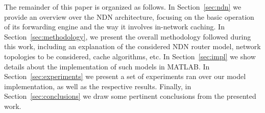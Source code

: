 The remainder of this paper is organized as follows. In Section~\ref{sec:ndn} we provide an 
overview over the NDN architecture, focusing on the basic operation of its 
forwarding engine and the way it involves in-network caching. In 
Section~\ref{sec:methodology}, we present the overall methodology followed 
during this work, including an explanation of the considered NDN router model, 
network topologies to be considered, cache algorithms, etc. In 
Section~\ref{sec:impl} we show details about the implementation of 
such models in MATLAB\textsuperscript{\textregistered}. In Section~\ref{sec:experiments} we present a set of 
experiments ran over our model implementation, as well as the respective 
results. Finally, in Section~\ref{sec:conclusions} we draw some pertinent 
conclusions from the presented work.
